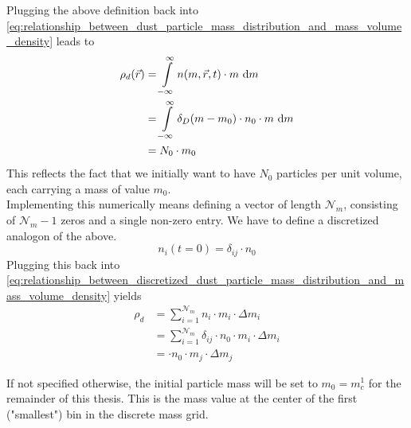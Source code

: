     Plugging the above definition back into
    \cref{eq:relationship_between_dust_particle_mass_distribution_and_mass_volume_density}
    leads to
    \begin{align}
        \rho_d(\vec r) 
            &= \int\limits_{-\infty}^\infty n(m, \vec r, t) \cdot m\ \text dm \\
            &= \int\limits_{-\infty}^\infty \delta_D(m-m_0) \cdot n_0 \cdot m\ \text dm \\
            &= N_0 \cdot m_0
    \end{align}
    This reflects the fact that we initially want to have $N_0$ particles per unit volume, each 
    carrying a mass of value $m_0$. \\

    Implementing this numerically means defining a vector of length $\mathcal N_m$, consisting of 
    $\mathcal N_m-1$ zeros and a single non-zero entry.
    We have to define a discretized analogon of the above.
    \begin{equation}
        n_i(t=0) = \delta_{ij} \cdot n_0
    \end{equation}
    Plugging this back into 
    \cref{eq:relationship_between_discretized_dust_particle_mass_distribution_and_mass_volume_density}
    yields
    \begin{align}
        \rho_d 
            &= \sum_{i=1}^{\mathcal N_m} n_i \cdot m_i \cdot \Delta m_i \\
            &= \sum_{i=1}^{\mathcal N_m} \delta_{ij} \cdot n_0 \cdot m_i \cdot \Delta m_i \\
            &= \cdot n_0 \cdot m_j \cdot \Delta m_j
    \end{align}


    If not specified otherwise, the initial particle mass will be set to $m_0 = m_c^1$ for the
    remainder of this thesis. This is the mass value at the center of the first ("smallest") bin 
    in the discrete mass grid.



